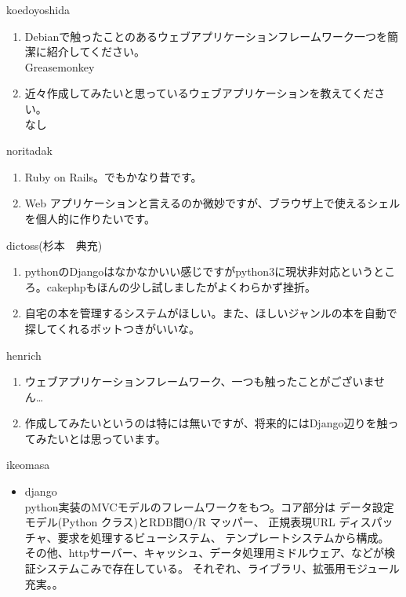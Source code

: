 \begin{prework}{ koedoyoshida }
\begin{enumerate}
\item  Debianで触ったことのあるウェブアプリケーションフレームワーク一つを簡潔に紹介してください。\\
Greasemonkey
\item 近々作成してみたいと思っているウェブアプリケーションを教えてください。\\
なし 
\end{enumerate}
\end{prework}

\begin{prework}{ noritadak }
\begin{enumerate}
\item Ruby on Rails。でもかなり昔です。
\item Web アプリケーションと言えるのか微妙ですが、ブラウザ上で使えるシェルを個人的に作りたいです。
\end{enumerate}
\end{prework}

\begin{prework}{ dictoss(杉本　典充) }
\begin{enumerate}
\item pythonのDjangoはなかなかいい感じですがpython3に現状非対応というところ。cakephpもほんの少し試しましたがよくわらかず挫折。
\item 自宅の本を管理するシステムがほしい。また、ほしいジャンルの本を自動で探してくれるボットつきがいいな。
\end{enumerate}
\end{prework}

\begin{prework}{ henrich }
\begin{enumerate}
\item ウェブアプリケーションフレームワーク、一つも触ったことがございません…
\item 作成してみたいというのは特には無いですが、将来的にはDjango辺りを触ってみたいとは思っています。
\end{enumerate}
\end{prework}

\begin{prework}{ ikeomasa }
\begin{itemize}
\item django\\
python実装のMVCモデルのフレームワークをもつ。コア部分は データ設定モデル(Python クラス)とRDB間O/R マッパー、 正規表現URL ディスパッチャ、要求を処理するビューシステム、 テンプレートシステムから構成。
その他、httpサーバー、キャッシュ、データ処理用ミドルウェア、などが検証システムこみで存在している。
それぞれ、ライブラリ、拡張用モジュール充実。。
\end{itemize}
\end{prework}

